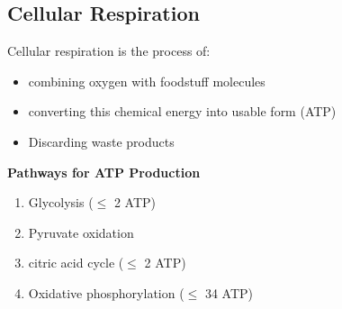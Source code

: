 \documentclass[11pt,fleqn]{book} %
\begin{document}
\subsection{Cellular Respiration}
Cellular respiration is the process of:
\begin{itemize}
    \item combining oxygen with foodstuff molecules
    \item converting this chemical energy into usable form (ATP)
    \item Discarding waste products
\end{itemize}
\textbf{Pathways for ATP Production}
\begin{enumerate}
    \item Glycolysis ($\leq$ 2 ATP)
    \item Pyruvate oxidation
    \item citric acid cycle ($\leq$ 2 ATP)
    \item Oxidative phosphorylation ($\leq$ 34 ATP)
\end{enumerate}
\end{document}
